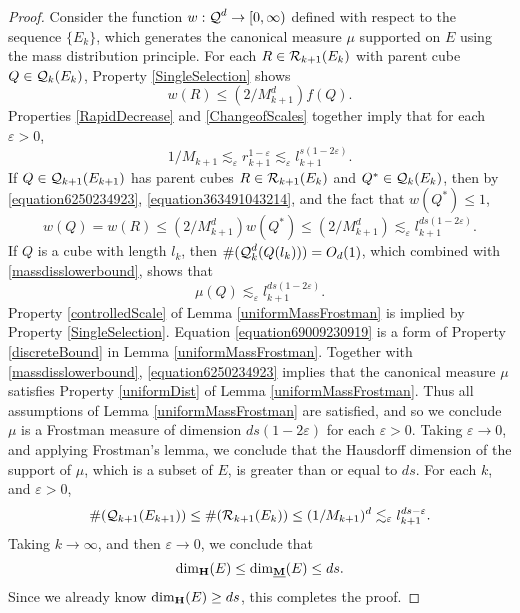 \begin{proof}
	Consider the function $w: \operatorname{\mathcal{Q}}^d \to [0,\infty)$ defined with respect to the sequence $\{ E_k \}$, which generates the canonical measure $\mu$ supported on $E$ using the mass distribution principle. For each $R \in \operatorname{\mathcal{R}}_{k+1}(E_k)$ with parent cube $Q \in \operatorname{\mathcal{Q}}_k(E_k)$, Property \ref{SingleSelection} shows
	\begin{equation} \label{equation6250234923} w(R) \leq (2/M_{k+1}^d) f(Q). \end{equation}
	Properties \ref{RapidDecrease} and \ref{ChangeofScales} together imply that for each $\varepsilon > 0$,
	\begin{equation} \label{equation363491043214} 1/M_{k+1} \lesssim_\varepsilon r_{k+1}^{1 - \varepsilon} \lesssim_\varepsilon l_{k+1}^{s(1  - 2 \varepsilon)}. \end{equation}
	If $Q \in \operatorname{\mathcal{Q}}_{k+1}(E_{k+1})$ has parent cubes $R \in \operatorname{\mathcal{R}}_{k+1}(E_k)$ and $Q^* \in \operatorname{\mathcal{Q}}_k(E_k)$, then by \eqref{equation6250234923}, \eqref{equation363491043214}, and the fact that $w(Q^*) \leq 1$,
	\begin{equation} \label{equation120492309562} w(Q) = w(R) \leq (2/M_{k+1}^d) w(Q^*) \leq (2/M_{k+1}^d) \lesssim_{\varepsilon} l_{k+1}^{ds(1 - 2\varepsilon)}. \end{equation}
	If $Q$ is a cube with length $l_k$, then $\#(\operatorname{\mathcal{Q}}_k^d(Q(l_k))) = O_d(1)$, which combined with \eqref{massdisslowerbound}, shows that
	\begin{equation} \label{equation69009230919} \mu(Q) \lesssim_\varepsilon l_{k+1}^{ds(1-2\varepsilon)}. \end{equation}
	Property \ref{controlledScale} of Lemma \ref{uniformMassFrostman} is implied by Property \ref{SingleSelection}.  Equation \eqref{equation69009230919} is a form of Property \ref{discreteBound} in Lemma \ref{uniformMassFrostman}. Together with \eqref{massdisslowerbound}, \eqref{equation6250234923} implies that the canonical measure $\mu$ satisfies Property \ref{uniformDist} of Lemma \ref{uniformMassFrostman}. Thus all assumptions of Lemma \ref{uniformMassFrostman} are satisfied, and so we conclude $\mu$ is a Frostman measure of dimension $ds(1 - 2\varepsilon)$ for each $\varepsilon > 0$. Taking $\varepsilon \to 0$, and applying Frostman's lemma, we conclude that the Hausdorff dimension of the support of $\mu$, which is a subset of $E$, is greater than or equal to $ds$. For each $k$, and $\varepsilon > 0$,
	\[ \#(\operatorname{\mathcal{Q}}_{k+1}(E_{k+1})) \leq \#(\operatorname{\mathcal{R}}_{k+1}(E_k)) \leq (1/M_{k+1})^d \lesssim_\varepsilon l_{k+1}^{ds - \varepsilon}. \]
	Taking $k \to \infty$, and then $\varepsilon \to 0$, we conclude that
	\[ \operatorname{\dim_{\mathbf{H}}}(E) \leq \operatorname{\dim_{\underline{\mathbf{M}}}}(E) \leq ds. \]
	Since we already know $\operatorname{\dim_{\mathbf{H}}}(E) \geq ds$, this completes the proof.
\end{proof}

